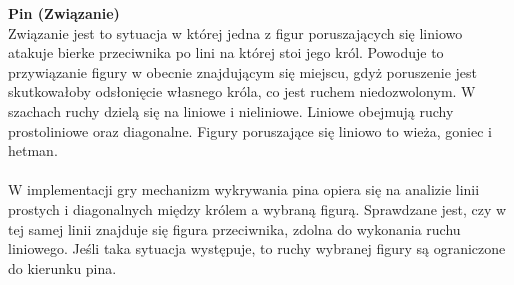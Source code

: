 \documentclass[twoside]{projektInzynierskiMS1}
\begin{document}
\newpage

\noindent \textbf{Pin (Związanie)}\\
Związanie jest to sytuacja w której jedna z figur poruszających się liniowo atakuje bierke przeciwnika po lini na której stoi jego król. Powoduje to przywiązanie figury w obecnie znajdującym się miejscu, gdyż poruszenie jest skutkowałoby odsłonięcie własnego króla, co jest ruchem niedozwolonym. W szachach ruchy dzielą się na liniowe i nieliniowe. Liniowe obejmują ruchy prostoliniowe oraz diagonalne. Figury poruszające się liniowo to wieża, goniec i hetman.
\\\\
W implementacji gry mechanizm wykrywania pina opiera się na analizie linii prostych i diagonalnych między królem a wybraną figurą. Sprawdzane jest, czy w tej samej linii znajduje się figura przeciwnika, zdolna do wykonania ruchu liniowego. Jeśli taka sytuacja występuje, to ruchy wybranej figury są ograniczone do kierunku pina.
\end{document}

